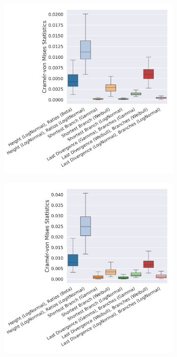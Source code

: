 \documentclass[10pt,letterpaper]{article}
\begin{document}
\begin{figure}
	\caption{The Cramér-von Mises criterion for the different distributions and datasets. (The lower the better.)}
	
	\centering
	\begin{subfigure}[b]{0.45\textwidth}
		\centering
		\includegraphics[width=\textwidth]{figures/yule-100-ccd1-cvm.png}
	\end{subfigure}
	\begin{subfigure}[b]{0.45\textwidth}
		\centering
		\includegraphics[width=\textwidth]{figures/yule-200-ccd1-cvm.png}
	\end{subfigure}
	

\end{figure}
\end{document}
